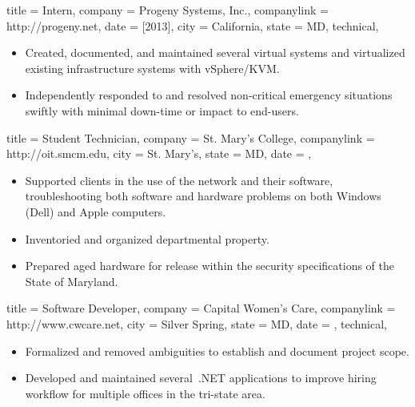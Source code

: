 \documentclass{simplecv}
\begin{document}
\begin{position}
  {
    title   = Intern,
    company = {Progeny Systems, Inc.},
    companylink = http://progeny.net,
    date    = [2013],
    city    = California,
    state   = MD,
    technical,
  }

\begin{itemize}
\item Created, documented, and maintained several virtual systems
  and virtualized existing infrastructure systems with vSphere\slash KVM.
\item Independently responded to and resolved non-critical emergency situations swiftly
  with minimal down-time or impact to end-users.
\end{itemize}
\end{position}

\begin{position}
  {
    title   = Student Technician,
    company = St. Mary's College,%
    companylink = http://oit.smcm.edu,
    city    = St. Mary's,
    state   = MD,
    date    = ,
  }

\begin{itemize}
\item Supported clients in the use of the network and their software,
  troubleshooting both software and hardware problems on both Windows (Dell) and Apple computers.
\item Inventoried and organized departmental property.
\item Prepared aged hardware for release within the security specifications of the State of Maryland.
\end{itemize}
\end{position}

\begin{position}
  {
    title   = Software Developer,
    company = Capital Women's Care,
    companylink = http://www.cwcare.net,
    city    = Silver Spring,
    state   = MD,
    date    = ,
    technical,
  }

\begin{itemize}
\item Formalized and removed ambiguities to establish and document project scope.
\item Developed and maintained several \CSharp\,.NET applications to
  improve hiring workflow for multiple offices in the tri-state area.
\end{itemize}
\end{position}
\vfill
\end{document}
